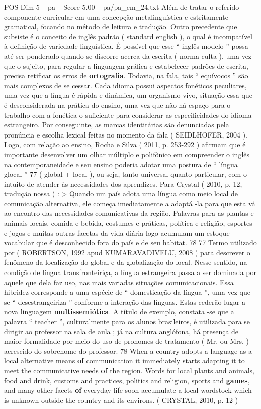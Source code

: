 \begin{textsample}{POS Dim 5 – pa – Score 5.00 – pa/pa\_em\_24.txt}
Além de tratar o referido componente curricular em uma concepção metalinguística e estritamente gramatical, focando no método de leitura e tradução.
Outro precedente que subsiste é o conceito de inglês padrão ( standard english ), o qual é incompatível à definição de variedade linguística.
É possível que esse “ inglês modelo ” possa até ser ponderado quando se discorre acerca da escrita ( norma culta ), uma vez que o sujeito, para regular a linguagem gráfica e estabelecer padrões de escrita, precisa retificar os erros de \textbf{ortografia}.
Todavia, na fala, tais “ equívocos ” são mais complexos de se cessar.
Cada idioma possui aspectos fonéticos peculiares, uma vez que a língua é rápida e dinâmica, um organismo vivo, situação essa que é desconsiderada na prática do ensino, uma vez que não há espaço para o trabalho com a fonética o suficiente para considerar as especificidades do idioma estrangeiro.
Por conseguinte, as marcas identitárias são denunciadas pela pronúncia e escolha lexical feitas no momento da fala ( SEIDLHOFER, 2004 ).
Logo, com relação ao ensino, Rocha e Silva ( 2011, p. 253-292 ) afirmam que é importante desenvolver um olhar múltiplo e polifônico em compreender o inglês na contemporaneidade e seu ensino poderia adotar uma postura de “ língua glocal ” 77 ( global + local ), ou seja, tanto universal quanto particular, com o intuito de atender às necessidades dos aprendizes.
Para Crystal ( 2010, p. 12, tradução nossa ) : > Quando um país adota uma língua como meio local de comunicação alternativa, ele começa imediatamente a adaptá -la para que esta vá ao encontro das necessidades comunicativas da região.
Palavras para as plantas e animais locais, comida e bebida, costumes e práticas, política e religião, esportes e jogos e muitas outras facetas da vida diária logo acumulam um estoque vocabular que é desconhecido fora do país e de seu habitat. 78 77 Termo utilizado por ( ROBERTSON, 1992 apud KUMARAVADIVELU, 2008 ) para descrever o fenômeno da localização do global e da globalização do local.
Nesse sentido, na condição de língua transfronteiriça, a língua estrangeira passa a ser dominada por aquele que dela faz uso, nas mais variadas situações comunicacionais.
Essa hibridez corresponde a uma espécie de “ domesticação da língua ”, uma vez que se “ desestrangeiriza ” conforme a interação das línguas.
Estas cederão lugar a nova linguagem \textbf{multissemiótica}.
A título de exemplo, constata -se que a palavra “ teacher ”, culturalmente para os alunos brasileiros, é utilizada para se dirigir ao professor na sala de aula ; já na cultura anglófona, há presença de maior formalidade por meio do uso de pronomes de tratamento ( Mr. ou Mrs. ) acrescido do sobrenome do professor. 78 When a country adopts a language as a local alternative means \textbf{of} communication it immediately starts adapting it to meet the communicative needs \textbf{of} the region.
Words for local plants and animals, food and drink, customs and practices, politics and religion, sports and \textbf{games}, and many other facets \textbf{of} everyday life soon accumulate a local wordstock which is unknown outside the country and its environs. ( CRYSTAL, 2010, p. 12 )

\end{textsample}
